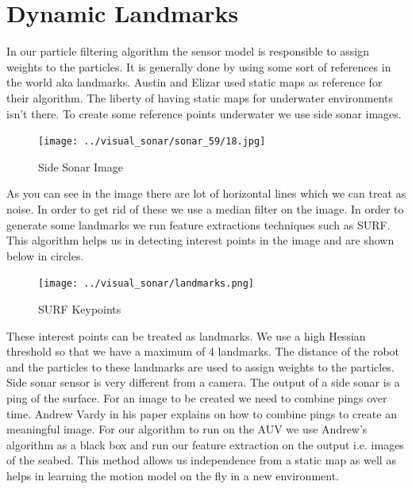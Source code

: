 \documentclass[12pt]{dalcsthesis}
\begin{document}
\section{Dynamic Landmarks}
In our particle filtering algorithm the sensor model is responsible to assign weights to the particles. It is generally done by using some sort of references in the world aka landmarks. Austin and Elizar used static maps as reference for their algorithm. The liberty of having static maps for underwater environments isn't there. To create some reference points underwater we use side sonar images.
\begin{figure}[hbtp]
\caption{Side Sonar Image}
\centering
\texttt{[image: ../visual\_sonar/sonar\_59/18.jpg]}
\end{figure}
As you can see in the image there are lot of horizontal lines which we can treat as noise. In order to get rid of  these we use a median filter on the image. In order to generate some landmarks we run feature extractions techniques such as SURF. This algorithm helps us in detecting interest points in the image and are shown below in circles. 
\begin{figure}[hbtp]
\caption{SURF Keypoints}
\centering
\texttt{[image: ../visual\_sonar/landmarks.png]}
\end{figure}

These interest points can be treated as landmarks. We use a high Hessian
threshold so that we have a maximum of 4 landmarks. The distance of the robot and the particles to these landmarks are used to assign weights to the particles.
\\
Side sonar sensor is very different from a camera. The output of a side sonar is a ping of the surface. For an image to be created we need to combine pings over time. Andrew Vardy in his paper explains on how to combine pings to create an meaningful image. For our algorithm to run on the AUV we use Andrew's algorithm as a black box and run our feature extraction on the output i.e. images of the seabed. 
This method allows us independence from a static map as well as helps in learning
the motion model on the fly in a new environment. 
\end{document}
